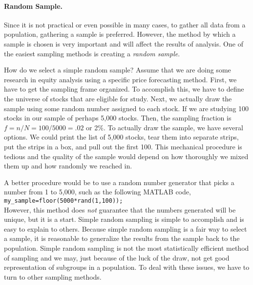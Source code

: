 \paragraph{Random Sample.} 
Since it is not practical or even possible in many cases, to gather all data from a population, gathering a sample is preferred. However, the method by which a sample is chosen is very important and will affect the results of analysis. One of the easiest sampling methods is creating a \emph{random sample}.

How do we select a simple random sample? Assume that we are doing some research in equity analysis using a specific price forecasting method. First, we have to get the sampling frame organized. To accomplish this, we have to define the universe of stocks that are eligible for study. Next, we actually draw the sample using some random number assigned to each stock. If we are studying 100 stocks in our sample of perhaps 5,000 stocks. Then, the sampling fraction is $f = n/N = 100/5000 = .02$ or 2\%. To actually draw the sample, we have several options. We could print the list of 5,000 stocks, tear them into separate strips, put the strips in a box, and pull out the first 100. This mechanical procedure is tedious and the quality of the sample would depend on how thoroughly we mixed them up and how randomly we reached in.

A better procedure would be to use a random number generator that picks a number from 1 to 5,000, such as the following MATLAB code,\\

\texttt{my\_sample=floor(5000*rand(1,100));} \\

However, this method does \emph{not} guarantee that the numbers generated will be unique, but it is a start. Simple random sampling is simple to accomplish and is easy to explain to others. Because simple random sampling is a fair way to select a sample, it is reasonable to generalize the results from the sample back to the population. Simple random sampling is not the most statistically efficient method of sampling and we may, just because of the luck of the draw, not get good representation of subgroups in a population. To deal with these issues, we have to turn to other sampling methods.

